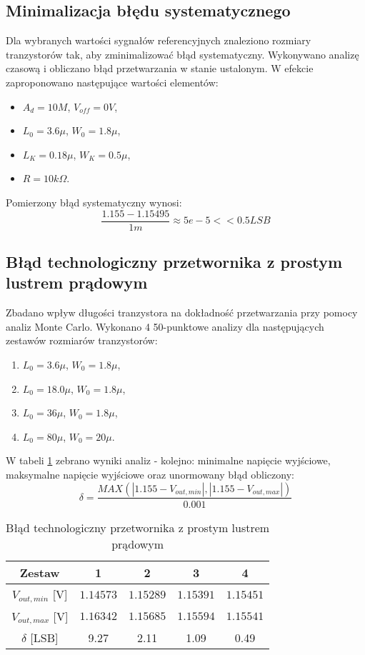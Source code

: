 \documentclass[10pt,a4paper,twoside]{report}
\theoremstyle{definition}
\theoremstyle{definition}
\theoremstyle{definition}
\theoremstyle{definition}
\theoremstyle{definition}
\begin{document}
{{	\subsection{Minimalizacja błędu systematycznego}
	{	Dla wybranych wartości sygnałów referencyjnych znaleziono rozmiary tranzystorów tak, aby zminimalizować błąd systematyczny. Wykonywano analizę czasową i obliczano błąd przetwarzania w stanie ustalonym. W efekcie zaproponowano następujące wartości elementów:
	\begin{itemize}
		\item $A_d = 10M$, $V_{off} = 0V$,
		\item $L_0 = 3.6\mu$, $W_0 = 1.8\mu$,
		\item $L_K = 0.18\mu$, $W_K = 0.5\mu$,
		\item $R = 10k \Omega$.
	\end{itemize}
	{ Pomierzony błąd systematyczny wynosi: 
		\begin{equation}
		 \frac{1.155- 1.15495}{1m} \approx 5e-5 << 0.5 LSB
		\end{equation} 
	}
	
	\subsection{Błąd technologiczny przetwornika z prostym lustrem prądowym}
	{	Zbadano wpływ długości tranzystora na dokładność przetwarzania przy pomocy analiz Monte Carlo. Wykonano 4 50-punktowe analizy dla następujących zestawów rozmiarów tranzystorów:
		\begin{enumerate}
			\item $L_0 = 3.6\mu$, $W_0 = 1.8\mu$,
			\item $L_0 = 18.0\mu$, $W_0 = 1.8\mu$,
			\item $L_0 = 36\mu$, $W_0 = 1.8\mu$,
			\item $L_0 = 80\mu$, $W_0 = 20\mu$.
		\end{enumerate}
	W tabeli \ref{tab:delta_simple} zebrano wyniki analiz - kolejno: minimalne napięcie wyjściowe, maksymalne napięcie wyjściowe oraz unormowany błąd obliczony:
	$$
	\delta = \frac{MAX(|1.155-V_{out,min}|,|1.155-V_{out,max}|)}{0.001}
	$$

	\begin{table}[!ht]
	\begin{center}				
		\begin{tabular}{|c|c|c|c|c|}
			\hline 
			Zestaw & 1 & 2 & 3  & 4\\ 
			\hline 
			$V_{out,min}$ [V] & $1.14573$ & $1.15289$ & $1.15391$ & $1.15451$ \\ 
			\hline
			$V_{out,max}$ [V] & $1.16342$ & $1.15685$ & $1.15594$ & $1.15541$\\ 
			\hline 
			$\delta$ [LSB]  & 9.27 & 2.11 & 1.09 & 0.49\\
			\hline
		\end{tabular} 
	\caption{Błąd technologiczny przetwornika z prostym lustrem prądowym}
	\label{tab:delta_simple}
	\end{center}
	\end{table}

}}}}
\end{document}

